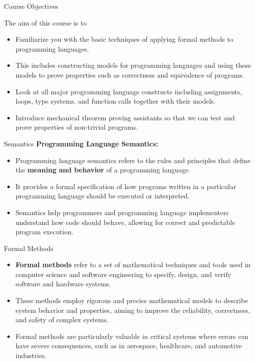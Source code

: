\documentclass{beamer}
\begin{document}
\begin{frame}{Course Objectives}

The aim of this course is to
\begin{itemize}
\item Familiarize you with the basic techniques of applying formal methods to programming languages.

\item This includes constructing models for programming languages and using these models to prove properties such as correctness and equivalence of programs.

\item Look at all major programming language constructs including assignments, loops, type systems, and function calls together with their models.

\item Introduce mechanical theorem proving assistants so that we can test and prove properties of non-trivial programs.
\end{itemize}
\end{frame}

\begin{frame}{Semantics}
\vspace{.1in}
{\bf Programming Language Semantics:}
\begin{itemize}
\item
Programming language semantics refers to the rules and principles that define the {\bf meaning and behavior} of a programming language. 

\item
It provides a formal specification of how programs written in a particular programming language should be executed or interpreted. 

\item
Semantics help programmers and programming language implementers understand how code should behave, allowing for correct and predictable program execution.
\end{itemize}
\end{frame}


\begin{frame}{Formal Methods}
\begin{itemize}
\item
{\bf Formal methods} refer to a set of mathematical techniques and tools used in computer science and software engineering to specify, design, and verify software and hardware systems. 

\item
These methods employ rigorous and precise mathematical models to describe system behavior and properties, aiming to improve the reliability, correctness, and safety of complex systems. 

\item
Formal methods are particularly valuable in critical systems where errors can have severe consequences, such as in aerospace, healthcare, and automotive industries.
\end{itemize}
\end{frame}
\end{document}
